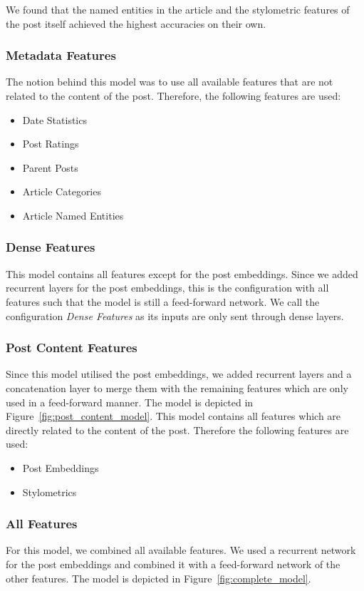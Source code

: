 \documentclass[acmsmall]{acmart}
\begin{document}
We found that the named entities in the article and the stylometric features of the post itself achieved the highest accuracies on their own.

\subsubsection{Metadata Features}
The notion behind this model was to use all available features that are not related to the content of the post. Therefore, the following features are used:
\begin{itemize}
\item Date Statistics
\item Post Ratings
\item Parent Posts
\item Article Categories
\item Article Named Entities
\end{itemize}

\subsubsection{Dense Features}
This model contains all features except for the post embeddings. Since we added recurrent layers for the post embeddings, this is the configuration with all features such that the model is still a feed-forward network. We call the configuration \textit{Dense Features} as its inputs are only sent through dense layers.


\subsubsection{Post Content Features}
Since this model utilised the post embeddings, we added recurrent layers and a concatenation layer to merge them with the remaining features which are only used in a feed-forward manner. 
The model is depicted in Figure~\ref{fig:post_content_model}.
This model contains all features which are directly related to the content of the post.
Therefore the following features are used:
\begin{itemize}
\item Post Embeddings
\item Stylometrics
\end{itemize}


\subsubsection{All Features}
For this model, we combined all available features. We used a recurrent network for the post embeddings and combined it with a feed-forward network of the other features. The model is depicted in Figure~\ref{fig:complete_model}.
\end{document}
